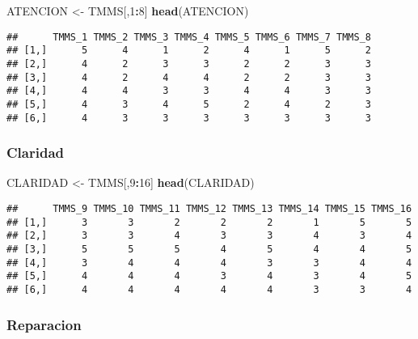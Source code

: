 \documentclass[
  10pt,
  spanish,
]{article}
\newenvironment{Shaded}{\begin{snugshade}}{\end{snugshade}}
\newcommand{\DecValTok}[1]{\textcolor[rgb]{0.00,0.00,0.81}{#1}}
\newcommand{\KeywordTok}[1]{\textcolor[rgb]{0.13,0.29,0.53}{\textbf{#1}}}
\newcommand{\NormalTok}[1]{#1}
\newcommand{\OperatorTok}[1]{\textcolor[rgb]{0.81,0.36,0.00}{\textbf{#1}}}
\newcommand{\StringTok}[1]{\textcolor[rgb]{0.31,0.60,0.02}{#1}}
\begin{document}
\begin{Shaded}
\begin{Highlighting}[]
\NormalTok{ATENCION <-}\StringTok{ }\NormalTok{TMMS[,}\DecValTok{1}\OperatorTok{:}\DecValTok{8}\NormalTok{]}
\KeywordTok{head}\NormalTok{(ATENCION)}
\end{Highlighting}
\end{Shaded}

\begin{verbatim}
##      TMMS_1 TMMS_2 TMMS_3 TMMS_4 TMMS_5 TMMS_6 TMMS_7 TMMS_8
## [1,]      5      4      1      2      4      1      5      2
## [2,]      4      2      3      3      2      2      3      3
## [3,]      4      2      4      4      2      2      3      3
## [4,]      4      4      3      3      4      4      3      3
## [5,]      4      3      4      5      2      4      2      3
## [6,]      4      3      3      3      3      3      3      3
\end{verbatim}

\hypertarget{claridad}{%
\subsubsection{Claridad}\label{claridad}}

\begin{Shaded}
\begin{Highlighting}[]
\NormalTok{CLARIDAD <-}\StringTok{ }\NormalTok{TMMS[,}\DecValTok{9}\OperatorTok{:}\DecValTok{16}\NormalTok{]}
\KeywordTok{head}\NormalTok{(CLARIDAD)}
\end{Highlighting}
\end{Shaded}

\begin{verbatim}
##      TMMS_9 TMMS_10 TMMS_11 TMMS_12 TMMS_13 TMMS_14 TMMS_15 TMMS_16
## [1,]      3       3       2       2       2       1       5       5
## [2,]      3       3       4       3       3       4       3       4
## [3,]      5       5       5       4       5       4       4       5
## [4,]      3       4       4       4       3       3       4       4
## [5,]      4       4       4       3       4       3       4       5
## [6,]      4       4       4       4       4       3       3       4
\end{verbatim}

\hypertarget{reparacion}{%
\subsubsection{Reparacion}\label{reparacion}}
\end{document}

